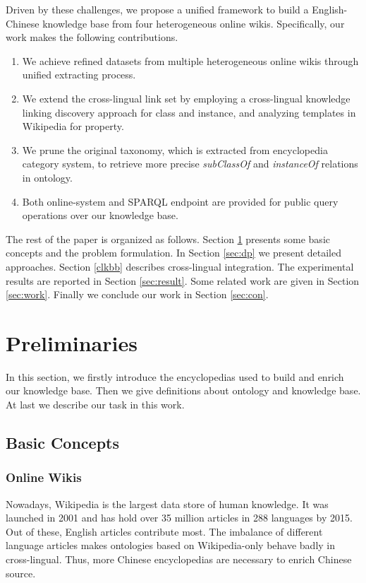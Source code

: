 \documentclass[runningheads,a4paper]{llncs}
\begin{document}
\begin{CJK*}{UTF8}{song}
Driven by these challenges, we propose a unified framework to build a English-Chinese knowledge base from four heterogeneous online wikis. Specifically, our work makes the following contributions.
\begin{enumerate}
  \item We achieve refined datasets from multiple heterogeneous online wikis through unified extracting process. 
  \item We extend the cross-lingual link set by employing a cross-lingual knowledge linking discovery approach for class and instance, and analyzing templates in Wikipedia for property.
  \item We prune the original taxonomy, which is extracted from encyclopedia category system, to retrieve more precise \textit{subClassOf} and \textit{instanceOf} relations in ontology.
  \item Both online-system and SPARQL endpoint are provided for public query operations over our knowledge base.
\end{enumerate}

The rest of the paper is organized as follows. Section \ref{sec:pd} presents some basic concepts and the problem formulation. In Section \ref{sec:dp} we present detailed approaches. Section \ref{clkbb} describes cross-lingual integration. The experimental results are reported in Section \ref{sec:result}. Some related work are given in Section \ref{sec:work}. Finally we conclude our work in Section \ref{sec:con}.

\section{Preliminaries}
\label{sec:pd}
In this section, we firstly introduce the encyclopedias used to build and enrich our knowledge base. Then we give definitions about ontology and knowledge base. At last we describe our task in this work.

\subsection{Basic Concepts}
\subsubsection{Online Wikis}
Nowadays, Wikipedia is the largest data store of human knowledge. It was launched in 2001 and has hold over 35 million articles in 288 languages by 2015. Out of these, English articles contribute most. The imbalance of different language articles makes ontologies based on Wikipedia-only behave badly in cross-lingual. Thus, more Chinese encyclopedias are necessary to enrich Chinese source.


\end{CJK*}
\end{document}
